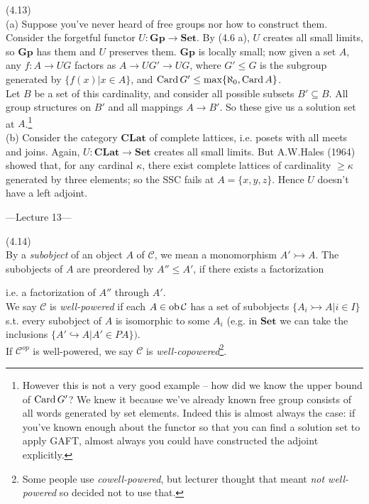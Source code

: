 \documentclass[a4paper]{article}
\begin{document}
\begin{eg} (4.13)\\
    (a) Suppose you've never heard of free groups nor how to construct them. Consider the forgetful functor $U: \mathbf{Gp} \to \mathbf{Set}$. By (4.6 a), $U$ creates all small limits, so $\mathbf{Gp}$ has them and $U$ preserves them. $\mathbf{Gp}$ is locally small; now given a set $A$, any $f:A \to UG$ factors as $A \to UG' \to UG$, where $G' \leq G$ is the subgroup generated by $\{f(x) |x \in A\}$, and $\operatorname{Card} G' \leq \max\{\aleph_0,\operatorname{Card} A\}$.\\
    Let $B$ be a set of this cardinality, and consider all possible subsets $B' \subseteq B$. All group structures on $B'$ and all mappings $A \to B'$. So these give us a solution set at $A$.\footnote{However this is not a very good example -- how did we know the upper bound of $\operatorname{Card} G'$? We knew it because we've already known free group consists of all words generated by set elements. Indeed this is almost always the case: if you've known enough about the functor so that you can find a solution set to apply GAFT, almost always you could have constructed the adjoint explicitly.}\\
    (b) Consider the category $\mathbf{CLat}$ of complete lattices, i.e. posets with all meets and joins. Again, $U:\mathbf{CLat} \to \mathbf{Set}$ creates all small limits. But A.W.Hales (1964) showed that, for any cardinal $\kappa$, there exist complete lattices of cardinality $\geq \kappa$ generated by three elements; so the SSC fails at $A=\{x,y,z\}$. Hence $U$ doesn't have a left adjoint.
\end{eg}

---Lecture 13---

\begin{defi} (4.14)\\
    By a \emph{subobject} of an object $A$ of $\mathcal{C}$, we mean a monomorphism $A' \rightarrowtail A$. The subobjects of $A$ are preordered by $A'' \leq A'$, if there exists a factorization 
    i.e. a factorization of $A''$ through $A'$.\\
    We say $\mathcal{C}$ is \emph{well-powered} if each $A \in \operatorname{ob}\mathcal{C}$ has a set of subobjects $\{A_i \rightarrowtail A | i \in I\}$ s.t. every subobject of $A$ is isomorphic to some $A_i$ (e.g. in $\mathbf{Set}$ we can take the inclusions $\{A' \hookrightarrow A| A'\in PA\})$.\\
    If $\mathcal{C}^{op}$ is well-powered, we say $\mathcal{C}$ is \emph{well-copowered}\footnote{Some people use \emph{cowell-powered}, but lecturer thought that meant \emph{not well-powered} so decided not to use that.}. 
\end{defi}
\end{document}
